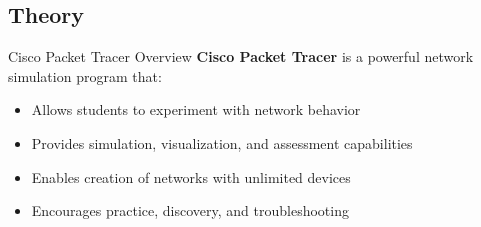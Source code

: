 \documentclass[12pt,a4paper]{article}
\begin{document}
\subsection{Theory}

\begin{theorybox}{Cisco Packet Tracer Overview}
\textbf{Cisco Packet Tracer} is a powerful network simulation program that:
\begin{itemize}[noitemsep]
    \item Allows students to experiment with network behavior
    \item Provides simulation, visualization, and assessment capabilities
    \item Enables creation of networks with unlimited devices
    \item Encourages practice, discovery, and troubleshooting
\end{itemize}
\end{theorybox}
\end{document}
